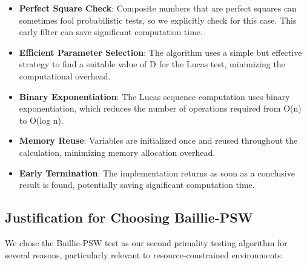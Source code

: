 \begin{itemize}
    \item \textbf{Perfect Square Check}: Composite numbers that are perfect squares can sometimes fool probabilistic tests, so we explicitly check for this case. This early filter can save significant computation time.
    
    \item \textbf{Efficient Parameter Selection}: The algorithm uses a simple but effective strategy to find a suitable value of D for the Lucas test, minimizing the computational overhead.
    
    \item \textbf{Binary Exponentiation}: The Lucas sequence computation uses binary exponentiation, which reduces the number of operations required from O(n) to O(log n).
    
    \item \textbf{Memory Reuse}: Variables are initialized once and reused throughout the calculation, minimizing memory allocation overhead.
    
    \item \textbf{Early Termination}: The implementation returns as soon as a conclusive result is found, potentially saving significant computation time.
\end{itemize}

\subsection{Justification for Choosing Baillie-PSW}

We chose the Baillie-PSW test as our second primality testing algorithm for several reasons, particularly relevant to resource-constrained environments:

